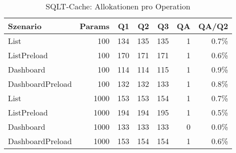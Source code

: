 \begin{table}[ht]
\centering
\caption{SQLT-Cache: Allokationen pro Operation}
\begin{tabular}{lrrrrrr}
\toprule
Szenario & Params & Q1 & Q2 & Q3 & QA & QA/Q2 \\
\midrule
		List & 100 & 134 & 135 & 135 & 1 & 0.7\% \\
		ListPreload & 100 & 170 & 171 & 171 & 1 & 0.6\% \\
		Dashboard & 100 & 114 & 114 & 115 & 1 & 0.9\% \\
		DashboardPreload & 100 & 132 & 132 & 133 & 1 & 0.8\% \\
		List & 1000 & 153 & 153 & 154 & 1 & 0.7\% \\
		ListPreload & 1000 & 194 & 194 & 195 & 1 & 0.5\% \\
		Dashboard & 1000 & 133 & 133 & 133 & 0 & 0.0\% \\
		DashboardPreload & 1000 & 153 & 154 & 154 & 1 & 0.6\% \\
\bottomrule
\end{tabular}
\label{tab:benchmark_sqlt-cache_allocsperop}
\end{table}
	